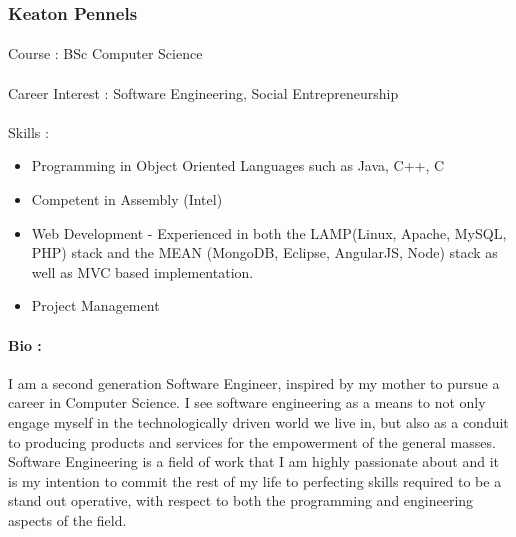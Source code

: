 \documentclass[11pt]{article}
\begin{document}
\subsubsection{Keaton Pennels}
\paragraph{}Course : BSc Computer Science 
\paragraph{}Career Interest : Software Engineering, Social Entrepreneurship
\paragraph{}Skills :
\begin{itemize}
\item Programming in Object Oriented Languages such as Java, C++, C
\item Competent in Assembly (Intel)
\item Web Development - Experienced in both the LAMP(Linux, Apache, MySQL, PHP) stack and the MEAN (MongoDB, Eclipse, AngularJS, Node) stack as well as MVC based implementation.
\item Project Management
\end{itemize}
\paragraph{Bio :}I am a second generation Software Engineer, inspired by my mother to pursue a career in Computer Science. I see software engineering as a means to not only engage myself in the technologically driven world we live in, but also as a conduit to producing products and services for the empowerment of the general masses. Software Engineering is a field of work that I am highly passionate about and it is my intention to commit the rest of my life to perfecting skills required to be a stand out operative, with respect to both the programming and engineering aspects of the field.
\end{document}

